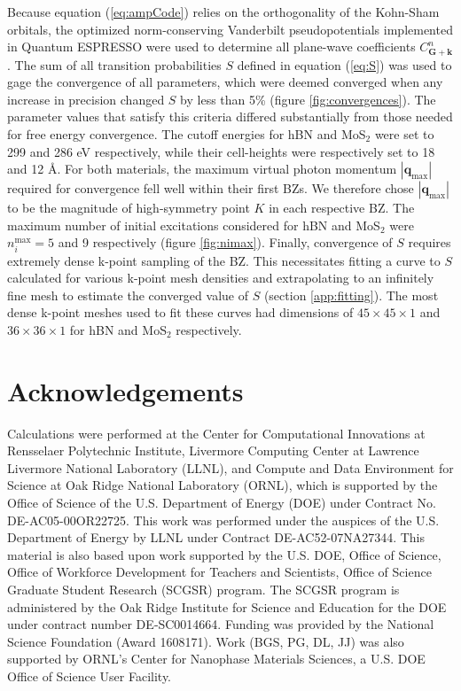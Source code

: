 \documentclass{article}
\begin{document}
Because equation (\ref{eq:ampCode}) relies on the orthogonality of the
Kohn-Sham orbitals, the optimized norm-conserving Vanderbilt pseudopotentials
\cite{Hamann2013, Schlipf2015} implemented in Quantum ESPRESSO
\cite{Giannozzi2009} were used to determine all plane-wave coefficients
$C^n_\mathbf{G+k}$.
The sum of all transition probabilities $S$ defined in equation (\ref{eq:S})
was used to gage the convergence of all parameters, which were deemed converged
when any increase in precision changed $S$ by less than 5\% (figure
\ref{fig:convergences}).
The parameter values that satisfy this criteria differed substantially from
those needed for free energy convergence.
The cutoff energies for hBN and MoS$_2$ were set to 299 and 286 eV
respectively, while their cell-heights were respectively set to 18 and 12
{\AA}.
For both materials, the maximum virtual photon momentum
$|\mathbf{q}_\text{max}|$ required for convergence fell well within their first
BZs.
We therefore chose $|\mathbf{q}_\text{max}|$ to be the magnitude of
high-symmetry point $K$ in each respective BZ.
The maximum number of initial excitations considered for hBN and MoS$_2$ were
$n_i^\text{max} = 5$ and 9 respectively (figure \ref{fig:nimax}).
Finally, convergence of $S$ requires extremely dense k-point sampling of the
BZ.
This necessitates fitting a curve to $S$ calculated for various k-point mesh
densities and extrapolating to an infinitely fine mesh to estimate the
converged value of $S$ (section \ref{app:fitting}).
The most dense k-point meshes used to fit these curves had dimensions of
$45\times45\times1$ and $36\times36\times1$ for hBN and MoS$_2$ respectively.

\section{Acknowledgements}
\label{sec:acknowledgements}

Calculations were performed at the Center for Computational Innovations at
Rensselaer Polytechnic Institute, Livermore Computing Center at Lawrence
Livermore National Laboratory (LLNL), and Compute and Data Environment for
Science at Oak Ridge National Laboratory (ORNL), which is supported by the
Office of Science of the U.S. Department of Energy (DOE) under Contract No.
DE-AC05-00OR22725.
This work was performed under the auspices of the U.S. Department of Energy by
LLNL under Contract DE-AC52-07NA27344.
This material is also based upon work supported by the U.S. DOE, Office of
Science, Office of Workforce Development for Teachers and Scientists, Office of
Science Graduate Student Research (SCGSR) program.
The SCGSR program is administered by the Oak Ridge Institute for Science and
Education for the DOE under contract number DE‐SC0014664.
Funding was provided by the National Science Foundation (Award 1608171).  Work
(BGS, PG, DL, JJ) was also supported by ORNL's Center for Nanophase Materials
Sciences, a U.S. DOE Office of Science User Facility.




\end{document}
